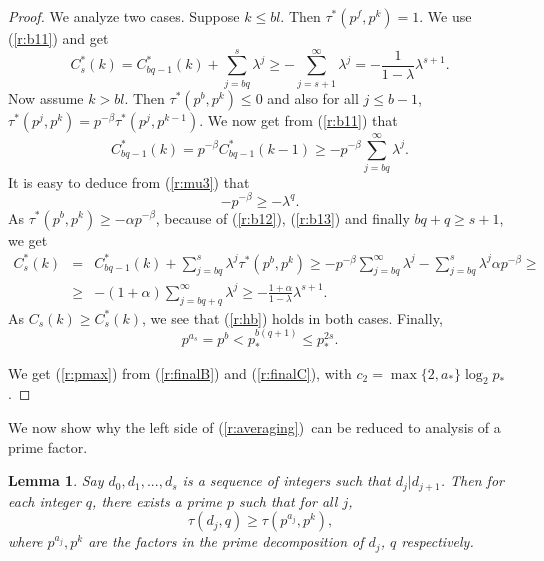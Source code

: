 \documentclass{amsart}
\newtheorem {lemma}{Lemma}
\numberwithin {equation}{section}
\begin{document}
\begin{proof}
We analyze two cases. Suppose $k\leq bl$. Then $\tau ^{\ast }(p^{f},p^{k})=1$. We use (\ref{r:b11}) and get 
\begin{equation*}
C_{s}^{\ast }(k)=C_{bq-1}^{\ast }(k)+\sum_{j=bq}^{s}\lambda ^{j}\geq
-\sum_{j=s+1}^{\infty }\lambda ^{j}=-\frac{1}{1-\lambda }\lambda ^{s+1}{\text{.}}
\end{equation*}Now assume $k>bl$. Then $\tau ^{\ast }(p^{b},p^{k})\leq 0$ and also for all $j\leq b-1$, $\tau ^{\ast }(p^{j},p^{k})=p^{-\beta }\tau ^{\ast
}(p^{j},p^{k-1})$. We now get from (\ref{r:b11}) that 
\begin{equation}
C_{bq-1}^{\ast }(k)=p^{-\beta }C_{bq-1}^{\ast }(k-1)\geq -p^{-\beta
}\sum_{j=bq}^{\infty }\lambda ^{j}{\text{.}}  \label{r:b12}
\end{equation}It is easy to deduce from (\ref{r:mu3}) that 
\begin{equation}
-p^{-\beta }\geq -\lambda ^{q}.  \label{r:b13}
\end{equation}As $\tau ^{\ast }(p^{b},p^{k})\geq -\alpha p^{-\beta }$, because of (\ref{r:b12}), (\ref{r:b13}) and finally $bq+q\geq s+1$, we get 
\begin{eqnarray*}
C_{s}^{\ast }(k) &=&C_{bq-1}^{\ast }(k)+\sum_{j=bq}^{s}\lambda ^{j}\tau
^{\ast }(p^{b},p^{k})\geq -p^{-\beta }\sum_{j=bq}^{\infty }\lambda
^{j}-\sum_{j=bq}^{s}\lambda ^{j}\alpha p^{-\beta }\geq \\
&\geq &-(1+\alpha )\sum_{j=bq+q}^{\infty }\lambda ^{j}\geq -\frac{1+\alpha }{1-\lambda }\lambda ^{s+1}{\text{.}}
\end{eqnarray*}As $C_{s}(k)\geq C_{s}^{\ast }(k)$, we see that (\ref{r:hb}) holds in both
cases. Finally, 
\begin{equation}
p^{a_{s}}=p^{b}<p_{\ast }^{b(q+1)}\leq p_{\ast }^{2s}{\text{.}}
\label{r:finalC}
\end{equation}

We get (\ref{r:pmax}) from (\ref{r:finalB}) and (\ref{r:finalC}), with $c_{2}=\max \{2,a_{\ast }\}\log _{2}p_{\ast }$.
\end{proof}

We now show why the left side of (\ref{r:averaging})\ can be reduced to
analysis of a prime factor.

\begin{lemma}
\label{l:av3}Say $d_{0},d_{1},...,d_{s}$ is a sequence of integers such that 
$d_{j}|d_{j+1}$. Then for each integer $q$, there exists a prime $p$ such
that for all $j$, 
\begin{equation}
\tau (d_{j},q)\geq \tau (p^{a_{j}},p^{k}){\text {,}}  \label{r:prim2}
\end{equation}
where $p^{a_{j}},p^{k}$ are the factors in the prime decomposition of $d_{j}$, $q$ respectively.
\end{lemma}
\end{document}
